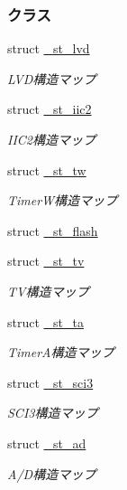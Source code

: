\subsubsection*{クラス}
\begin{DoxyCompactItemize}
\item 
struct \hyperlink{3694s_8h_d4/d84/struct__st__lvd}{\+\_\+st\+\_\+lvd}
\begin{DoxyCompactList}\small\item\em L\+V\+D構造マップ \end{DoxyCompactList}\item 
struct \hyperlink{3694s_8h_d8/dd9/struct__st__iic2}{\+\_\+st\+\_\+iic2}
\begin{DoxyCompactList}\small\item\em I\+I\+C2構造マップ \end{DoxyCompactList}\item 
struct \hyperlink{3694s_8h_d4/d2c/struct__st__tw}{\+\_\+st\+\_\+tw}
\begin{DoxyCompactList}\small\item\em Timer\+W構造マップ \end{DoxyCompactList}\item 
struct \hyperlink{3694s_8h_d2/d67/struct__st__flash}{\+\_\+st\+\_\+flash}
\item 
struct \hyperlink{3694s_8h_d2/d46/struct__st__tv}{\+\_\+st\+\_\+tv}
\begin{DoxyCompactList}\small\item\em T\+V構造マップ \end{DoxyCompactList}\item 
struct \hyperlink{3694s_8h_d3/d65/struct__st__ta}{\+\_\+st\+\_\+ta}
\begin{DoxyCompactList}\small\item\em Timer\+A構造マップ \end{DoxyCompactList}\item 
struct \hyperlink{3694s_8h_d7/d0b/struct__st__sci3}{\+\_\+st\+\_\+sci3}
\begin{DoxyCompactList}\small\item\em S\+C\+I3構造マップ \end{DoxyCompactList}\item 
struct \hyperlink{3694s_8h_d5/d81/struct__st__ad}{\+\_\+st\+\_\+ad}
\begin{DoxyCompactList}\small\item\em A/\+D構造マップ \end{DoxyCompactList}\item 

\end{DoxyCompactItemize}
